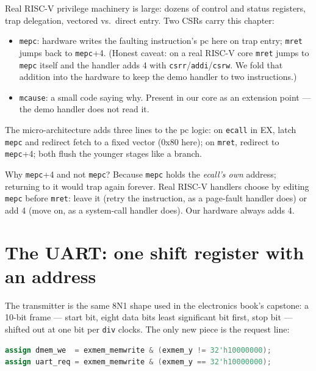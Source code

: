 Real RISC-V privilege machinery is large: dozens of control and
status registers, trap delegation, vectored vs.\ direct entry. Two
CSRs carry this chapter:

\begin{itemize}
\item \texttt{mepc}: hardware writes the faulting instruction's pc
      here on trap entry; \texttt{mret} jumps back to
      \texttt{mepc}+4. (Honest caveat: on a real RISC-V core
      \texttt{mret} jumps to \texttt{mepc} itself and the handler
      adds 4 with \texttt{csrr}/\texttt{addi}/\texttt{csrw}. We fold
      that addition into the hardware to keep the demo handler to two
      instructions.)
\item \texttt{mcause}: a small code saying why. Present in our core
      as an extension point --- the demo handler does not read it.
\end{itemize}

The micro-architecture adds three lines to the pc logic: on
\texttt{ecall} in EX, latch \texttt{mepc} and redirect fetch to a
fixed vector (0x80 here); on \texttt{mret}, redirect to
\texttt{mepc}+4; both flush the younger stages like a branch.





\begin{checkpoint}
Why \texttt{mepc}+4 and not \texttt{mepc}? Because \texttt{mepc}
holds the \emph{ecall's own} address; returning to it would trap
again forever. Real RISC-V handlers choose by editing \texttt{mepc} before
\texttt{mret}: leave it (retry the instruction, as a page-fault
handler does) or add 4 (move on, as a system-call handler does). Our
hardware always adds 4.
\end{checkpoint}

\section{The UART: one shift register with an address}
\label{sec:uart08}

The transmitter is the same 8N1 shape used in the electronics book's
capstone: a 10-bit frame --- start bit, eight data bits least
significant bit first, stop bit --- shifted out at one bit per
\texttt{div} clocks. The only new piece is the request line:

\begin{lstlisting}[language=Verilog,caption={The MMIO hook in
\texttt{rv32i\_soc\_top}: any store word whose address is
0x10000000 becomes a UART transmit request instead of a dmem
write.}]
assign dmem_we  = exmem_memwrite & (exmem_y != 32'h10000000);
assign uart_req = exmem_memwrite & (exmem_y == 32'h10000000);
\end{lstlisting}

